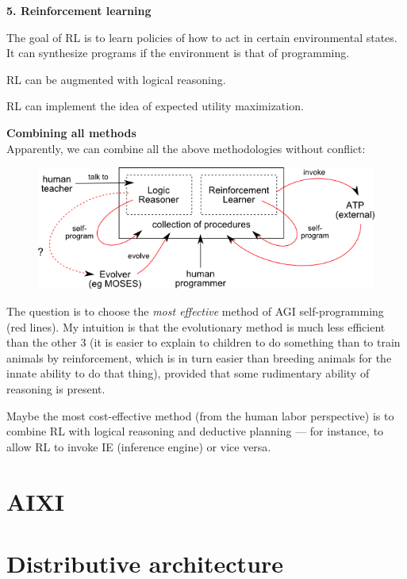 \textbf{5. Reinforcement learning} 
\begin{compactenum}[(a)]
\item  The goal of RL is to learn policies of how to act in certain environmental states.  It can synthesize programs if the environment is that of programming.
\item  RL can be augmented with logical reasoning.
\item  RL can implement the idea of expected utility maximization.
\\
\end{compactenum}

\textbf{Combining all methods}\\
Apparently, we can combine all the above methodologies without conflict:
\begin{figure}[H]
\centering
\includegraphics{combined-architecture.png}
\vspace{-0.5cm}
\end{figure}

The question is to choose the \textit{most effective} method of AGI self-programming (red lines).  My intuition is that the evolutionary method is much less efficient than the other 3 (it is easier to explain to children to do something than to train animals by reinforcement, which is in turn easier than breeding animals for the innate ability to do that thing), provided that some rudimentary ability of reasoning is present.

Maybe the most cost-effective method (from the human labor perspective) is to combine RL with logical reasoning and deductive planning --- for instance, to allow RL to invoke IE (inference engine) or vice versa.

\section{AIXI}

\section{Distributive architecture}
